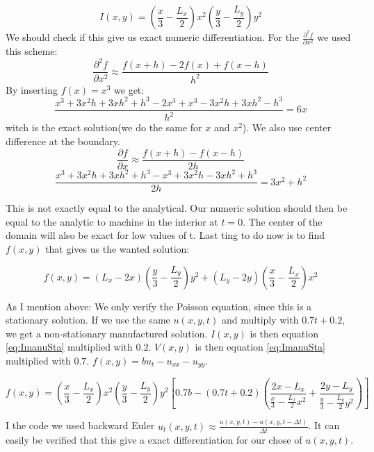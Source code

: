 \documentclass[12pt,a4paper,english]{article}
\begin{document}
\begin{equation}
I\left( x,y\right) = \left( \frac{x}{3} -\frac{L_x}{2}\right)x^2\left(\frac{y}{3} -\frac{L_y}{2} \right) y^2 
\label{eq:ImanuSta}
\end{equation}
We should check if this give us exact numeric differentiation. For the $\frac{\partial^2 f}{\partial x^2}$ we used this scheme:
$$ \frac{\partial^2 f}{\partial x^2} \approx \frac{f\left( x + h\right) - 2f\left( x\right) + f\left( x - h\right)}{h^2}$$
By inserting $f\left( x\right) = x^3$ we get:
$$\frac{x^3 + 3x^2h + 3xh^2 + h^3 - 2x^3 + x^3 -3x^2h + 3xh^2 -h^3}{h^2} = 6x$$
witch is the exact solution(we do the same for $x$ and $x^2$). We also use center difference at the boundary. 
$$\frac{\partial f}{\partial x} \approx \frac{f\left(x + h\right) - f\left( x - h\right)}{2h} $$ 
$$\frac{x^3 + 3x^2h + 3xh^2 + h^3 - x^3 + 3x^2h - 3xh^2 +h^3}{2h} = 3x^2 +h^2 $$

This is not exactly equal to the analytical. Our numeric solution should then be equal to the analytic to machine in the interior at $t=0$. The center of the domain will also be exact for low values of t. Last ting to do now is to find $f\left( x,y\right)$ that gives us the wanted solution:

$$f\left( x,y\right) = \left(L_x -2x \right) \left(\frac{y}{3} -\frac{L_y}{2} \right)y^2 + \left(L_y -2y \right) \left(\frac{x}{3} -\frac{L_x}{2} \right)x^2 $$

As I mention above: We only verify the Poisson equation, since this is a stationary solution. If we use the same $u\left( x,y,t\right)$ and multiply with $0.7t +0.2$, we get a non-stationary manufactured solution. $I\left( x,y\right)$ is then equation \ref{eq:ImanuSta} multiplied with $0.2$. $V\left( x,y\right)$ is then equation \ref{eq:ImanuSta} multiplied with $0.7$. $f\left( x,y\right) = bu_t - u_{xx} - u_{yy}$.

$$f\left( x,y\right) =\left( \frac{x}{3} -\frac{L_x}{2}\right)x^2\left(\frac{y}{3} -\frac{L_y}{2} \right) y^2 \left[ 0.7b - \left( 0.7t + 0.2\right) \left( \frac{2x-L_x}{\frac{x}{3} -\frac{L_x}{2}x^2} + \frac{2y-L_y}{\frac{y}{3} -\frac{L_y}{2} y^2}  \right) \right] $$

I the code we used backward Euler $u_t\left(x,y,t\right) \approx \frac{u\left(x,y,t\right) - u\left(x,y,t-\Delta t \right)} {\Delta t}$. It can easily be verified that this give a exact differentiation for our chose of $u\left(x,y,t\right)$. 




\end{document}

